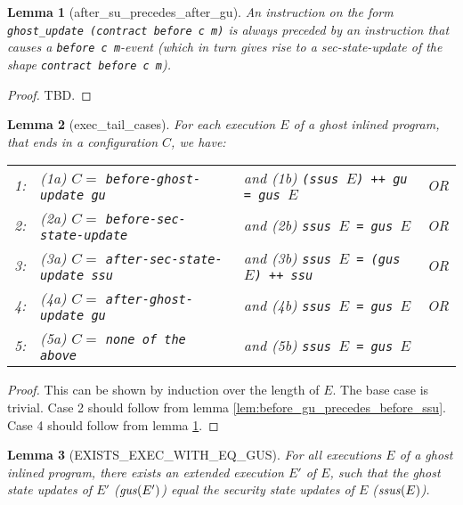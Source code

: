 \documentclass[a4paper,11pt]{article}
\newtheorem{lemma}{Lemma}
\begin{document}
\begin{lemma}[after\_su\_precedes\_after\_gu]\label{lem:after_su_precedes_after_gu}
An instruction on the form {\tt ghost\_update (contract before c m)} is always preceded by an instruction that causes a {\tt before c m}-event (which in turn gives rise to a sec-state-update of the shape {\tt contract before c m}).
\end{lemma}
\begin{proof}
TBD.
\end{proof}

\begin{lemma}[exec\_tail\_cases]\label{lem:exec_tail_cases}
For each execution $E$ of a ghost inlined program, that ends in a configuration $C$, we have:
\\\begin{tabular}{llll}
1: & (1a) $C = $ {\tt before-ghost-update gu}      & and (1b) {\tt (ssus $E$) ++ gu = gus $E$}   & OR \\
2: & (2a) $C = $ {\tt before-sec-state-update}     & and (2b) {\tt ssus $E$ = gus $E$}           & OR \\
3: & (3a) $C = $ {\tt after-sec-state-update ssu}  & and (3b) {\tt ssus $E$ = (gus $E$) ++ ssu}  & OR \\
4: & (4a) $C = $ {\tt after-ghost-update gu}       & and (4b) {\tt ssus $E$ = gus $E$}           & OR \\
5: & (5a) $C = $ {\tt none of the above}           & and (5b) {\tt ssus $E$ = gus $E$}           &
\end{tabular}
\end{lemma}

\begin{proof}
This can be shown by induction over the length of $E$. The base case is trivial. Case 2 should follow from lemma \ref{lem:before_gu_precedes_before_ssu}. Case 4 should follow from lemma \ref{lem:after_su_precedes_after_gu}.
\end{proof}

\begin{lemma}[EXISTS\_EXEC\_WITH\_EQ\_GUS]\label{lem:exists_exec_with_eq_gus}
For all executions $E$ of a ghost inlined program, there exists an extended execution $E'$ of $E$, such that the ghost state updates of $E'$ ($\mathit{gus}(E')$) equal the security state updates of $E$ ($\mathit{ssus}(E)$).
\end{lemma}
\end{document}

